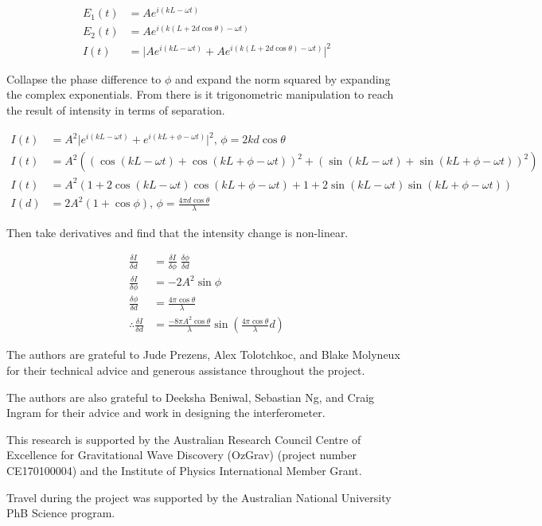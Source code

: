 \documentclass[prb,preprint]{revtex4-1}
\begin{document}
\begin{align}
\label{eq:intensity_derivation}
    E_1(t) &= A e^{i (k L - \omega t)} \\
    E_2(t) &= A e^{i (k (L + 2 d \cos{\theta}) - \omega t)} \\
    I(t) &= \lvert A e^{i (k L - \omega t)} + A e^{i (k (L + 2 d \cos{\theta}) - \omega t)} \rvert^2
\end{align}

Collapse the phase difference to $\phi$ and expand the norm squared by expanding the complex exponentials. From there is it trigonometric manipulation to reach the result of intensity in terms of separation.

\begin{align}    
    I(t) &= A^2 \lvert e^{i (k L - \omega t)} + e^{i (k L + \phi - \omega t)} \rvert^2,\, \phi = 2 k d \cos{\theta} \\
    I(t) &= A^2 ((\cos{(k L - \omega t)} + \cos{(k L + \phi - \omega t)})^2 + (\sin{(k L - \omega t)} + \sin{(k L + \phi - \omega t)})^2) \\
    I(t) &= A^2 (1 + 2 \cos{(k L - \omega t)} \cos{(k L + \phi - \omega t)} + 1 + 2 \sin{(k L - \omega t)} \sin{(k L + \phi - \omega t)}) \\
    I(d) &= 2 A^2 (1 + \cos{\phi}),\, \phi = \frac{4 \pi d \cos{\theta}}{\lambda}
\end{align}

Then take derivatives and find that the intensity change is non-linear.

\begin{align}    
    \frac{\delta I}{\delta d} &= \frac{\delta I}{\delta \phi}\; \frac{\delta \phi}{\delta d}\\
    \frac{\delta I}{\delta\phi} &= - 2 A^2 \sin{\phi}\\
    \frac{\delta\phi}{\delta d} &= \frac{4 \pi \cos{\theta}}{\lambda}\\
    \therefore \frac{\delta I}{\delta d} &= \frac{- 8 \pi A^2 \cos{\theta}}{\lambda} \sin{(\frac{4 \pi \cos{\theta}}{\lambda} d)}
\end{align}


\begin{acknowledgments}
The authors are grateful to Jude Prezens, Alex Tolotchkoc, and Blake Molyneux for their technical advice and generous assistance throughout the project.
	
The authors are also grateful to Deeksha Beniwal, Sebastian Ng, and Craig Ingram for their advice and work in designing the interferometer. 

This research is supported by the Australian Research Council Centre of Excellence for Gravitational Wave Discovery (OzGrav) (project number CE170100004) and the Institute of Physics International Member Grant.

Travel during the project was supported by the Australian National University PhB Science  program.

\end{acknowledgments}




\end{document}
